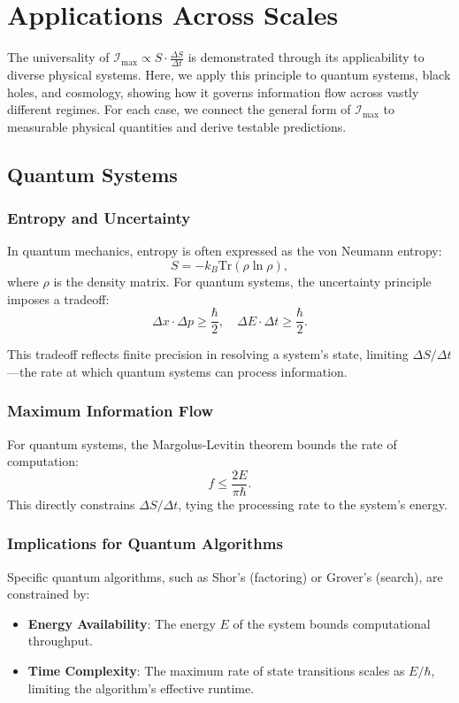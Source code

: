 \documentclass[12pt]{article}
\begin{document}
\section{Applications Across Scales}
The universality of \( \mathcal{I}_{\text{max}} \propto S \cdot \frac{\Delta S}{\Delta t} \) is demonstrated through its applicability to diverse physical systems. Here, we apply this principle to quantum systems, black holes, and cosmology, showing how it governs information flow across vastly different regimes. For each case, we connect the general form of \( \mathcal{I}_{\text{max}} \) to measurable physical quantities and derive testable predictions.

\subsection{Quantum Systems}
\subsubsection{Entropy and Uncertainty}
In quantum mechanics, entropy is often expressed as the von Neumann entropy:
\[
S = -k_B \text{Tr}(\rho \ln \rho),
\]
where \( \rho \) is the density matrix. For quantum systems, the uncertainty principle imposes a tradeoff:
\[
\Delta x \cdot \Delta p \geq \frac{\hbar}{2}, \quad \Delta E \cdot \Delta t \geq \frac{\hbar}{2}.
\]

This tradeoff reflects finite precision in resolving a system's state, limiting \( \Delta S / \Delta t \)—the rate at which quantum systems can process information.

\subsubsection{Maximum Information Flow}
For quantum systems, the Margolus-Levitin theorem bounds the rate of computation:
\[
f \leq \frac{2E}{\pi \hbar}.
\]
This directly constrains \( \Delta S / \Delta t \), tying the processing rate to the system’s energy.

\subsubsection{Implications for Quantum Algorithms}
Specific quantum algorithms, such as Shor’s (factoring) or Grover’s (search), are constrained by:
\begin{itemize}
    \item \textbf{Energy Availability}: The energy \( E \) of the system bounds computational throughput.
    \item \textbf{Time Complexity}: The maximum rate of state transitions scales as \( E / \hbar \), limiting the algorithm’s effective runtime.
\end{itemize}
\end{document}
